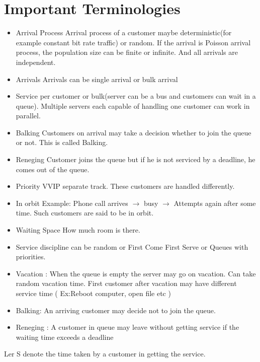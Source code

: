 \section{Important Terminologies}
\begin{itemize}
    \item Arrival Process \newline Arrival process of a customer maybe deterministic(for example constant bit rate traffic) or random. If the arrival is Poisson arrival process, the population size can be finite or infinite. And all arrivals are independent. 
    \item Arrivals \newline Arrivals can be single arrival or bulk arrival 
    \item Service  per customer or bulk(server can be a   bus and customers can wait in a queue). Multiple servers each capable of handling one customer can work in parallel.
    \item Balking \newline Customers on arrival may take a decision whether to join the queue or not. This is called Balking. 
    \item Reneging \newline Customer joins the queue but if he is not serviced by a deadline, he comes out of the queue. 
    \item Priority \newline VVIP separate track. These customers are handled differently. 
    \item In orbit \newline Example: Phone call arrives $\longrightarrow$ busy $\longrightarrow$ Attempts again after some time. Such customers are said to be in orbit.
    \item Waiting Space \newline How much room is there.
    \item Service discipline can be random or First Come First Serve or Queues with priorities.
    
    \item Vacation : When the queue is empty the server may go on vacation. Can take random vacation time. First customer after vacation may have different service time ( Ex:Reboot computer, open file etc )
    
    \item Balking:
    An arriving customer may decide not to join the queue.
    
    \item Reneging : A customer in queue may leave without getting service if the waiting time exceeds a deadline 
\end{itemize}
Ler S denote the time taken by a customer in getting the service.
